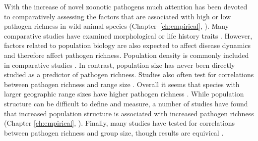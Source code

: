 





With the increase of novel zoonotic pathogens \cite{jones2008global} much attention has been devoted to comparatively assessing the factors that are associated with high or low pathogen richness in wild animal species (Chapter~\ref{ch:empirical}, \cites{poulin2000diversity, kamiya2014determines, luis2013comparison}).
Many comparative studies have examined morphological or life history traits \cite{kamiya2014determines, luis2013comparison}.
However, factors related to population biology are also expected to affect disease dynamics and therefore affect pathogen richness.
Population density is commonly included in comparative studies \cite{morand1998density, kamiya2014determines, lindenfors2007parasite, nunn2003comparative, arneberg2002host}.
In contrast, population size has never been directly studied as a predictor of pathogen richness.
Studies also often test for correlations between pathogen richness and range size \cite{lindenfors2007parasite, nunn2003comparative, turmelle2009correlates, huang2015parasite, kamiya2014determines}.
Overall it seems that species with larger geographic range sizes have higher pathogen richness \cite{kamiya2014determines}.
While population structure can be difficult to define and measure, a number of studies have found that increased population structure is associated with increased pathogen richness (Chapter \ref{ch:empirical}, \cites{maganga2014bat, turmelle2009correlates}).
Finally, many studies have tested for correlations between pathogen richness and group size, though results are equivical \cite{vitone2004body, gay2014parasite, ezenwa2006host, rifkin2012animals, nunn2003comparative}.


